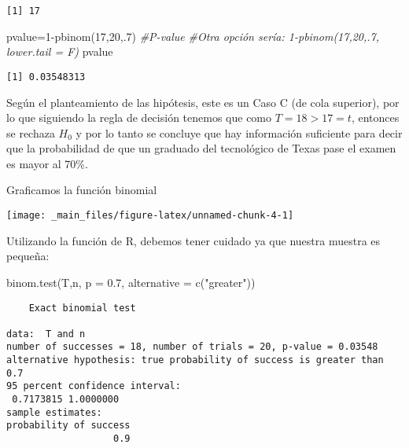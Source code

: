 \documentclass[
  a4paper,
  oneside,
  openany]{book}
\newenvironment{Shaded}{\begin{snugshade}}{\end{snugshade}}
\newcommand{\AttributeTok}[1]{\textcolor[rgb]{0.77,0.63,0.00}{#1}}
\newcommand{\CommentTok}[1]{\textcolor[rgb]{0.56,0.35,0.01}{\textit{#1}}}
\newcommand{\DecValTok}[1]{\textcolor[rgb]{0.00,0.00,0.81}{#1}}
\newcommand{\FloatTok}[1]{\textcolor[rgb]{0.00,0.00,0.81}{#1}}
\newcommand{\FunctionTok}[1]{\textcolor[rgb]{0.00,0.00,0.00}{#1}}
\newcommand{\NormalTok}[1]{#1}
\newcommand{\OtherTok}[1]{\textcolor[rgb]{0.56,0.35,0.01}{#1}}
\newcommand{\SpecialCharTok}[1]{\textcolor[rgb]{0.00,0.00,0.00}{#1}}
\newcommand{\StringTok}[1]{\textcolor[rgb]{0.31,0.60,0.02}{#1}}
\begin{document}
\begin{verbatim}
[1] 17
\end{verbatim}

\begin{Shaded}
\begin{Highlighting}[]
\NormalTok{pvalue}\OtherTok{=}\DecValTok{1}\SpecialCharTok{{-}}\FunctionTok{pbinom}\NormalTok{(}\DecValTok{17}\NormalTok{,}\DecValTok{20}\NormalTok{,.}\DecValTok{7}\NormalTok{)                 }\CommentTok{\#P{-}value}
\CommentTok{\#Otra opción sería: 1{-}pbinom(17,20,.7, lower.tail = F)}
\NormalTok{pvalue}
\end{Highlighting}
\end{Shaded}

\begin{verbatim}
[1] 0.03548313
\end{verbatim}

Según el planteamiento de las hipótesis, este es un Caso C (de cola superior), por lo que siguiendo la regla de decisión tenemos que como \(T=18>17=t\), entonces se rechaza \(H_0\) y por lo tanto se concluye que hay información suficiente para decir que la probabilidad de que un graduado del tecnológico de Texas pase el examen es mayor al 70\%.

Graficamos la función binomial

\begin{center}\texttt{[image: \_main\_files/figure-latex/unnamed-chunk-4-1]} \end{center}

Utilizando la función de R, debemos tener cuidado ya que nuestra muestra es pequeña:

\begin{Shaded}
\begin{Highlighting}[]
\FunctionTok{binom.test}\NormalTok{(T,n, }\AttributeTok{p =} \FloatTok{0.7}\NormalTok{, }\AttributeTok{alternative =} \FunctionTok{c}\NormalTok{(}\StringTok{"greater"}\NormalTok{))}
\end{Highlighting}
\end{Shaded}

\begin{verbatim}
    Exact binomial test

data:  T and n
number of successes = 18, number of trials = 20, p-value = 0.03548
alternative hypothesis: true probability of success is greater than 0.7
95 percent confidence interval:
 0.7173815 1.0000000
sample estimates:
probability of success 
                   0.9 
\end{verbatim}
\end{document}
